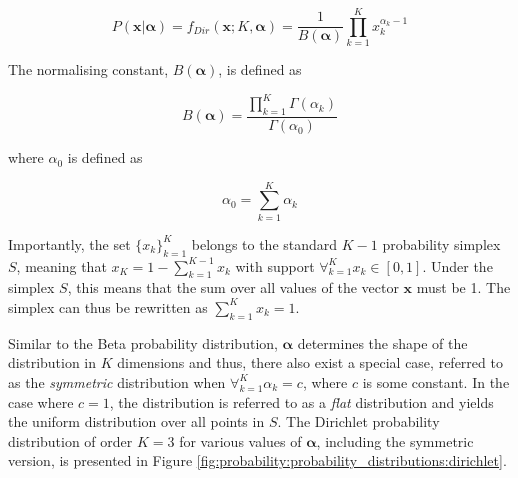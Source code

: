 \begin{equation}
      \label{eq:probability:probability_distributions:dirichlet:pdf}
      P(\boldsymbol{x} \vert \boldsymbol{\alpha}) =  f_{Dir}(\boldsymbol{x}; K, \boldsymbol{\alpha}) = \frac{1}{B(\boldsymbol{\alpha})}  \prod_{k=1}^{K} x_{k}^{\alpha_{k} - 1}
\end{equation}

The normalising constant, $B(\boldsymbol{\alpha})$, is defined as

\begin{equation}
      \label{eq:probability:probability_distributions:dirichlet:norm_cost}
      B(\boldsymbol{\alpha}) = \frac{\prod_{k=1}^{K} \Gamma(\alpha_{k})}{\Gamma(\alpha_{0})}
\end{equation}

where $\alpha_{0}$ is defined as

\begin{equation}
      \label{eq:probability:probability_distributions:dirichlet:alpha_0}
      \alpha_{0} = \sum_{k=1}^{K}\alpha_{k}
\end{equation}

Importantly, the set $\{x_{k}\}_{k=1}^{K}$ belongs to the standard $K-1$ probability simplex $S$, meaning that $x_{K} = 1 - \sum_{k=1}^{K-1}x_{k}$ with support $\forall_{k=1}^{K} x_{k} \in [0,1]$. Under the simplex $S$, this means that the sum over all values of the vector $\boldsymbol{x}$ must be 1. The simplex can thus be rewritten as $\sum_{k=1}^{K}x_{k} = 1$.

Similar to the Beta probability distribution, $\boldsymbol{\alpha}$ determines the shape of the distribution in $K$ dimensions and thus, there also exist a special case, referred to as the \textit{symmetric} distribution when $\forall_{k=1}^{K} \alpha_{k} = c$, where $c$ is some constant. In the case where $c = 1$, the distribution is referred to as a \textit{flat} distribution and yields the uniform distribution over all points in $S$. The Dirichlet probability distribution of order $K = 3$ for various values of $\boldsymbol{\alpha}$, including the symmetric version, is presented in Figure \ref{fig:probability:probability_distributions:dirichlet}.

